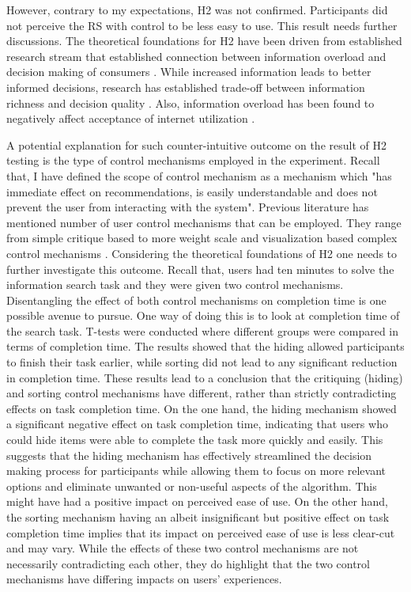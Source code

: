 \documentclass[a4paper,12pt]{article}
\begin{document}
However, contrary to my expectations, H2 was not confirmed. Participants did not perceive the RS with control to be less easy to use. This result needs further discussions. The theoretical foundations for H2 have been driven from established research stream that established connection between information overload and decision making of consumers \citep{jacoby1974brand, chenEffectsInformationOverload2009}. While increased information leads to better informed decisions, research has established trade-off between information richness and decision quality \citep{malhotra1982information, jacoby1974brand}. Also, information overload has been found to negatively affect acceptance of internet utilization \citep{shih2004extended}. 

A potential explanation for such counter-intuitive outcome on the result of H2 testing is the type of control mechanisms employed in the experiment. Recall that, I have defined the scope of control mechanism as a mechanism which "has immediate effect on recommendations, is easily understandable and does not prevent the user from interacting with the system". Previous literature has mentioned number of user control mechanisms that can be employed. They range from simple critique based to more weight scale and visualization based complex control mechanisms \citep{jannach2017user, jinEffectsPersonalCharacteristics2018}. Considering the theoretical foundations of H2 one needs to further investigate this outcome. Recall that, users had ten minutes to solve the information search task and they were given two control mechanisms. Disentangling the effect of both control mechanisms on completion time is one possible avenue to pursue. One way of doing this is to look at completion time of the search task. T-tests were conducted where different groups were compared in terms of completion time. The results showed that the hiding allowed participants to finish their task earlier, while sorting did not lead to any significant reduction in completion time. These results lead to a conclusion that the critiquing (hiding) and sorting control mechanisms have different, rather than strictly contradicting effects on task completion time. On the one hand, the hiding mechanism showed a significant negative effect on task completion time, indicating that users who could hide items were able to complete the task more quickly and easily. This suggests that the hiding mechanism has effectively streamlined the decision making process for participants while allowing them to focus on more relevant options and eliminate unwanted or non-useful aspects of the algorithm. This might have had a positive impact on perceived ease of use. On the other hand, the sorting mechanism having an albeit insignificant but positive effect on task completion time implies that its impact on perceived ease of use is less clear-cut and may vary. While the effects of these two control mechanisms are not necessarily contradicting each other, they do highlight that the two control mechanisms have differing impacts on users' experiences. 
\end{document}
